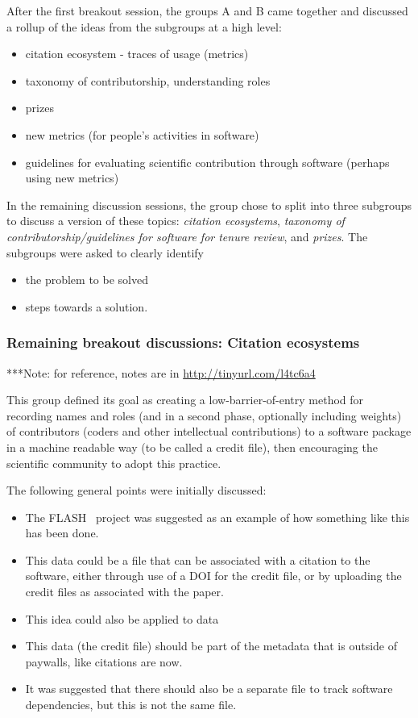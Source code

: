 \documentclass[11pt, oneside]{amsart}
\newcommand{\note}[1]{ {\textcolor{blueish}    { ***Note:      #1 }}}
\begin{document}
After the first breakout session, the groups A and B came together and discussed
a rollup of the ideas from the subgroups at a high level:
\begin{itemize}
\item citation ecosystem - traces of usage (metrics)
\item taxonomy of contributorship, understanding roles
\item prizes
\item new metrics (for people's activities in software)
\item guidelines for evaluating scientific contribution through software (perhaps 
using new metrics)
\end{itemize}

In the remaining discussion sessions, the group chose to split into three
subgroups to discuss a version of these topics: {\em citation ecosystems}, {\em
taxonomy of contributorship/guidelines for software for tenure review}, and {\em
prizes}. The subgroups were asked to clearly identify
\begin{itemize}
\item the problem to be solved
\item steps towards a solution.
\end{itemize}



\subsubsection{Remaining breakout discussions: Citation ecosystems}

\note{for reference, notes are in \url{http://tinyurl.com/l4tc6a4}}

This group defined its goal as creating a low-barrier-of-entry method for
recording names and roles (and in a second phase, optionally including weights)
of contributors (coders and other intellectual contributions) to a software
package in a machine readable way (to be called a credit file), then encouraging
the scientific community to adopt this practice.

The following general points were initially discussed: 
\begin{itemize}
\item The FLASH~\cite{flash} project was suggested as an example of how something 
like this has been done.
\item This data could be a file that can be associated with a citation to the 
software, either through use of a DOI for the credit file, or by uploading the 
credit files as associated with the paper.
\item This idea could also be applied to data
\item This data (the credit file) should be part of the metadata that is outside
of paywalls, like citations are now.
\item It was suggested that there should also be a separate file to track
software dependencies, but this is not the same file. 
\end{itemize}
\end{document}
